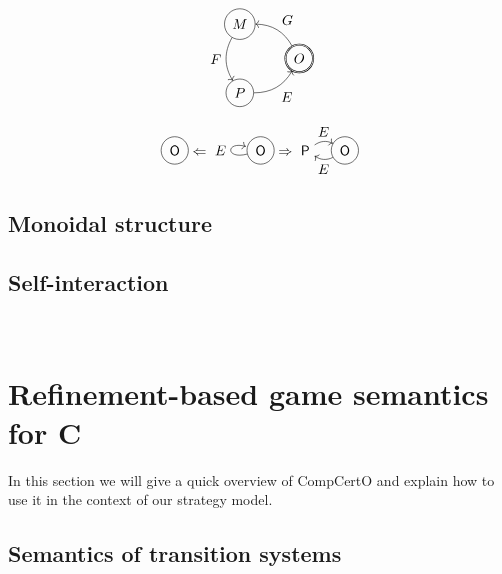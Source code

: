 \documentclass[format=sigplan,authordraft]{acmart}
\newcommand{\kw}[1]{\ensuremath{ \mathsf{#1} }}
\begin{document}
\[
  \begin{tikzpicture}
    \node[circle,double,draw] (O) at (0:1) {$O$};
    \node[circle,draw] (R) at (120:1) {$M$};
    \node[circle,draw] (L) at (-120:1) {$P$};
    \path[->] (O) edge[bend right] node[auto=right] {$G$} (R);
    \path[->] (R) edge[bend right] node[auto=right] {$F$} (L);
    \path[->] (L) edge[bend right] node[auto=right] {$E$} (O);
  \end{tikzpicture}
\]

\[
  \begin{tikzpicture}[baseline=(O.base)]
    \node[circle,draw] (O) at (0,0) {$\kw{O}$};
  \end{tikzpicture}
  \Leftarrow
  \begin{tikzpicture}[baseline=(O.base)]
    \node[circle,draw] (O) at (0,0) {$\kw{O}$};
    \path[->] (O) edge[loop left] node[auto] {$E$} (O);
  \end{tikzpicture}
  \Rightarrow
  \begin{tikzpicture}[baseline=(O.base)]
    \node[circle,draw] (O) at (1,0) {$\kw{O}$};
    \node (P) at (0,0) {$\kw{P}$};
    \path[->] (O) edge[bend left] node[below] {$E$} (P);
    \path[->] (P) edge[bend left] node[above] {$E$} (O);
  \end{tikzpicture}
\]


\subsection{Monoidal structure} %


\subsection{Self-interaction} %


\


\section{Refinement-based game semantics for C} %

In this section we will give a quick overview of CompCertO
and explain how to use it in the context of our strategy model.

\subsection{Semantics of transition systems} %
\end{document}

